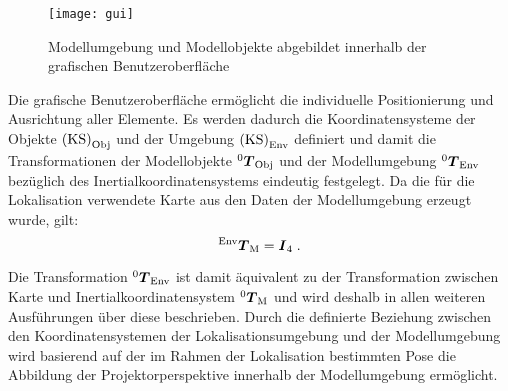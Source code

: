 \clearpage{}

\begin{figure}[!ht]
	\begin{center}
		\texttt{[image: gui]}
		\caption{Modellumgebung und Modellobjekte abgebildet innerhalb der grafischen Benutzeroberfläche}
		\label{fig.modscene}
	\end{center}
\end{figure}

\prever{
}

Die grafische Benutzeroberfläche ermöglicht die individuelle Positionierung und Ausrichtung aller Elemente. Es werden dadurch die Koordinatensysteme der Objekte ${\mathrm{(KS)}}_{\mathrm{Obj}}$ und der Umgebung ${\mathrm{(KS)}}_{\mathrm{Env}}$ definiert und damit die Transformationen der Modellobjekte ${^{\mathrm{0}}\mbox{\boldmath{$T$}}_{\mathrm{Obj}}}$ und der Modellumgebung ${^{\mathrm{0}}\mbox{\boldmath{$T$}}_{\mathrm{Env}}}$ bezüglich des Inertialkoordinatensystems eindeutig festgelegt. Da die für die Lokalisation verwendete Karte aus den Daten der Modellumgebung erzeugt wurde, gilt:
%
\begin{equation}
{^{\mathrm{Env}}\mbox{\boldmath{$T$}}_{\mathrm{M}}}=\mbox{\boldmath{$I$}}_{\mathrm{4}} \; \text{.}
\end{equation}


\prever{
}

Die Transformation ${^{\mathrm{0}}\mbox{\boldmath{$T$}}_{\mathrm{Env}}}$ ist damit äquivalent zu der Transformation zwischen Karte und Inertialkoordinatensystem ${^{\mathrm{0}}\mbox{\boldmath{$T$}}_{\mathrm{M}}}$ und wird deshalb in allen weiteren Ausführungen über diese beschrieben. Durch die definierte Beziehung zwischen den Koordinatensystemen der Lokalisationsumgebung und der Modellumgebung wird basierend auf der im Rahmen der Lokalisation bestimmten Pose die Abbildung der Projektorperspektive innerhalb der Modellumgebung ermöglicht.
\prever{
}

